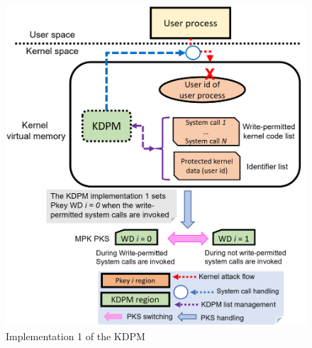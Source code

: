 \begin{figure}[tb]
  \begin{center}
    \includegraphics[bb=0 0 530 565, scale=.360]{./imgs/004_screenshot_2021-07-28_18.34.36.png}
  \end{center}
  \caption{
    Implementation 1 of the KDPM
  }
 \label{fig:implementation1_overview}
\end{figure}

